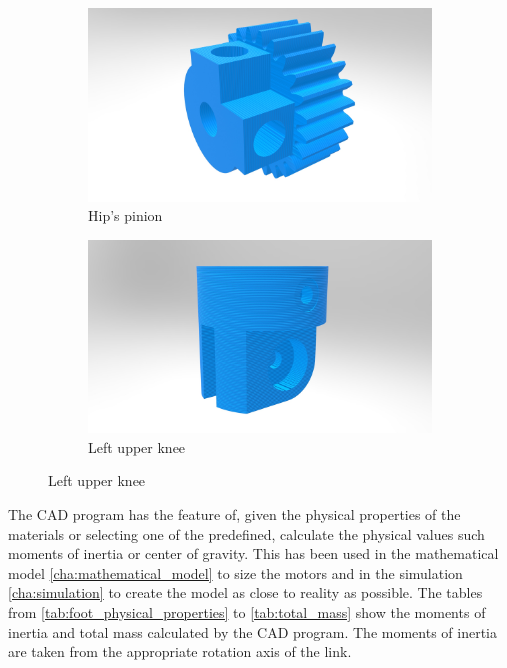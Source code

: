 \begin{figure}[ht!]
    \ContinuedFloat %
    \begin{subfigure}[b]{0.49\textwidth}
        \includegraphics[width=\textwidth]{figures/legs_hip_pinion.jpg}
        \caption{Hip's pinion}
        \label{fig:hip_pinion}
    \end{subfigure}
    \begin{subfigure}[b]{0.49\textwidth}
        \includegraphics[width=\textwidth]{figures/legs_knee_upper.jpg}
        \caption{Left upper knee}
        \label{fig:knee_upper}
    \end{subfigure}
\end{figure}

The CAD program has the feature of, given the physical properties of the materials or selecting one of the predefined, calculate the physical values such moments of inertia or center of gravity.
This has been used in the mathematical model \ref{cha:mathematical_model} to size the motors and in the simulation \ref{cha:simulation} to create the model as close to reality as possible.
The tables from \ref{tab:foot_physical_properties} to \ref{tab:total_mass} show the moments of inertia and total mass calculated by the CAD program.
The moments of inertia are taken from the appropriate rotation axis of the link.

